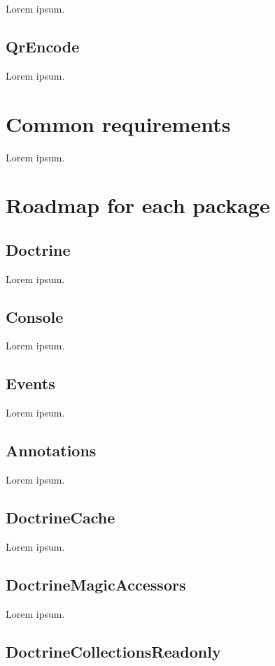 Lorem ipsum.

\subsection{QrEncode}

Lorem ipsum.

\section{Common requirements}

Lorem ipsum.

\section{Roadmap for each package}

\subsection{Doctrine}

Lorem ipsum.

\subsection{Console}

Lorem ipsum.

\subsection{Events}

Lorem ipsum.

\subsection{Annotations}

Lorem ipsum.

\subsection{DoctrineCache}

Lorem ipsum.

\subsection{DoctrineMagicAccessors}

Lorem ipsum.

\subsection{DoctrineCollectionsReadonly}

